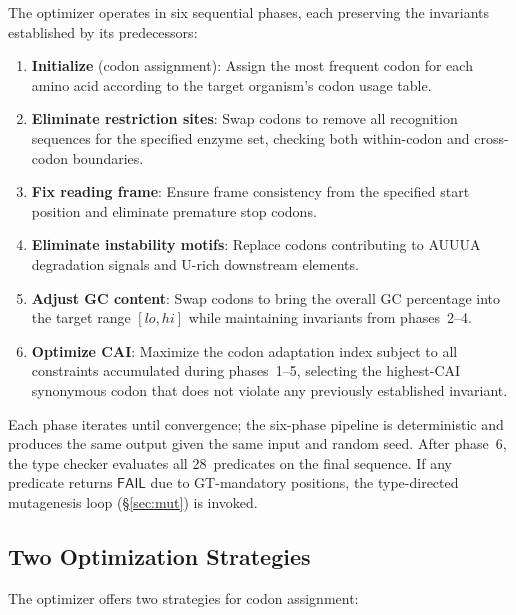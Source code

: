 \documentclass[acmsmall,review,anonymous]{acmart}
\newcommand{\FAIL}{\ensuremath{\mathsf{FAIL}}\xspace}
\begin{document}
The optimizer operates in six sequential phases, each preserving the
invariants established by its predecessors:

\begin{enumerate}[leftmargin=*,itemsep=1pt,topsep=2pt]
\item \textbf{Initialize} (codon assignment): Assign the most frequent
      codon for each amino acid according to the target organism's codon
      usage table.
\item \textbf{Eliminate restriction sites}: Swap codons to remove all
      recognition sequences for the specified enzyme set, checking both
      within-codon and cross-codon boundaries.
\item \textbf{Fix reading frame}: Ensure frame consistency from the
      specified start position and eliminate premature stop codons.
\item \textbf{Eliminate instability motifs}: Replace codons contributing
      to AUUUA degradation signals and U-rich downstream elements.
\item \textbf{Adjust GC content}: Swap codons to bring the overall GC
      percentage into the target range $[lo, hi]$ while maintaining
      invariants from phases~2--4.
\item \textbf{Optimize CAI}: Maximize the codon adaptation index subject
      to all constraints accumulated during phases~1--5, selecting the
      highest-CAI synonymous codon that does not violate any previously
      established invariant.
\end{enumerate}

Each phase iterates until convergence; the six-phase pipeline is
deterministic and produces the same output given the same input and
random seed.  After phase~6, the type checker evaluates all 28~predicates
on the final sequence.  If any predicate returns \FAIL{} due to
GT-mandatory positions, the type-directed mutagenesis loop
(\S\ref{sec:mut}) is invoked.

\subsection{Two Optimization Strategies}\label{sec:strategies}

The optimizer offers two strategies for codon assignment:
\end{document}

